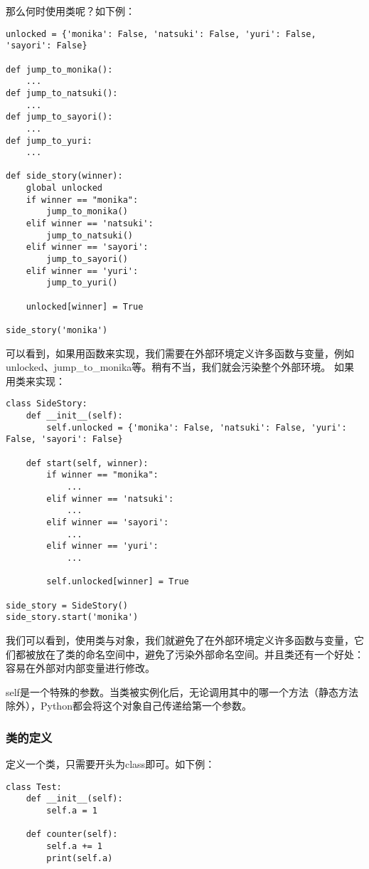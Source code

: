 \documentclass[../../Main.tex]{subfiles}
\begin{document}
那么何时使用类呢？如下例：
\begin{lstlisting}
unlocked = {'monika': False, 'natsuki': False, 'yuri': False, 'sayori': False}

def jump_to_monika():
    ...
def jump_to_natsuki():
    ...
def jump_to_sayori():
    ...
def jump_to_yuri:
    ...

def side_story(winner):
    global unlocked
    if winner == "monika":
        jump_to_monika()
    elif winner == 'natsuki':
        jump_to_natsuki()
    elif winner == 'sayori':
        jump_to_sayori()
    elif winner == 'yuri':
        jump_to_yuri()

    unlocked[winner] = True

side_story('monika')

\end{lstlisting}
可以看到，如果用函数来实现，我们需要在外部环境定义许多函数与变量，例如unlocked、jump\_to\_monika等。稍有不当，我们就会污染整个外部环境。
如果用类来实现：
\begin{lstlisting}
class SideStory:
    def __init__(self):
        self.unlocked = {'monika': False, 'natsuki': False, 'yuri': False, 'sayori': False}

    def start(self, winner):
        if winner == "monika":
            ...
        elif winner == 'natsuki':
            ...
        elif winner == 'sayori':
            ...
        elif winner == 'yuri':
            ...
        
        self.unlocked[winner] = True

side_story = SideStory()
side_story.start('monika')
\end{lstlisting}
我们可以看到，使用类与对象，我们就避免了在外部环境定义许多函数与变量，它们都被放在了类的命名空间中，避免了污染外部命名空间。并且类还有一个好处：容易在外部对内部变量进行修改。

\begin{ExtraKnowledge}
    self是一个特殊的参数。当类被实例化后，无论调用其中的哪一个方法（静态方法除外），Python都会将这个对象自己传递给第一个参数。
\end{ExtraKnowledge}

\subsubsection{类的定义}
定义一个类，只需要开头为class即可。如下例：

\begin{lstlisting}
class Test:
    def __init__(self):
        self.a = 1

    def counter(self):
        self.a += 1
        print(self.a)
\end{lstlisting}
\end{document}

